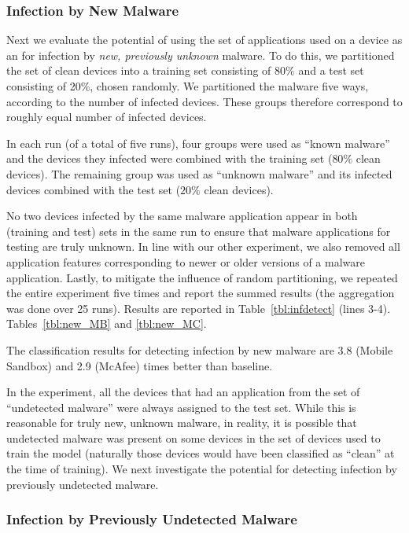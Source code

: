 \subsubsection{Infection by New Malware}
\label{subsubsec:predictions:applications:new}

Next we evaluate the potential of using the set of applications used
on a device as an {\predictor}  for infection by \textit{new, previously
  unknown} malware.  To do this, we partitioned the set of clean devices
into a training set consisting of $80\%$ and a test set consisting of
20\%, chosen randomly. We partitioned the malware five ways, according to the number of infected devices.
These
groups therefore correspond to roughly equal number of infected
devices. 

In each run (of a total of five runs), four groups were used as ``known
malware'' and the devices they infected were combined with the
training set ($80\%$ clean devices).  The remaining group was used as
``unknown malware'' and its infected devices combined with the test
set ($20\%$ clean devices).


No two devices infected by the same malware application appear in both
(training and test) sets in the same run to ensure that malware
applications for testing are truly unknown. In line with our other
experiment, we also removed all application features corresponding to
newer or older versions of a malware application. Lastly, to mitigate
the influence of random partitioning, we repeated the entire experiment
five times and report the summed results (the aggregation was done
over 25 runs). Results are reported in 
\ifwww
Table~\ref{tbl:infdetect} (lines 3-4).
\else
Tables~\ref{tbl:new_MB} and
\ref{tbl:new_MC}.
\fi

The classification results for detecting infection
by new malware are 3.8 (Mobile Sandbox) and 2.9 (McAfee) times better
than baseline.

In the experiment, all the devices that had an application from the
set of ``undetected malware'' were always assigned to the test set.
While this is reasonable for truly new, unknown malware, in reality,
it is possible that undetected malware was present on some devices in
the set of devices used to train the model (naturally those devices
would have been classified as ``clean'' at the time of training). We
next investigate the potential for detecting infection by previously
undetected malware.


\subsubsection{Infection by Previously Undetected Malware}
\label{subsubsec:predictions:applications:undetected}

